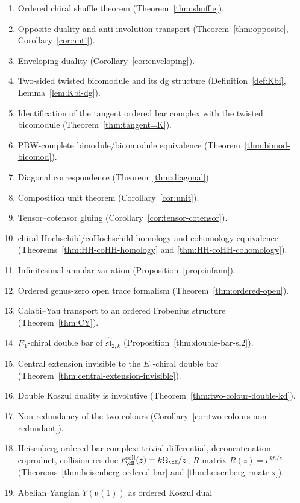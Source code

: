 \begin{enumerate}[label=(\arabic*)]
\item Ordered chiral shuffle theorem (Theorem~\ref{thm:shuffle}).
\item Opposite-duality and anti-involution transport (Theorem~\ref{thm:opposite},
Corollary~\ref{cor:anti}).
\item Enveloping duality (Corollary~\ref{cor:enveloping}).
\item Two-sided twisted bicomodule and its dg structure (Definition~\ref{def:Kbi},
Lemma~\ref{lem:Kbi-dg}).
\item Identification of the tangent ordered bar complex with the twisted bicomodule
(Theorem~\ref{thm:tangent=K}).
\item PBW-complete bimodule/bicomodule equivalence (Theorem~\ref{thm:bimod-bicomod}).
\item Diagonal correspondence (Theorem~\ref{thm:diagonal}).
\item Composition unit theorem (Corollary~\ref{cor:unit}).
\item Tensor--cotensor gluing (Corollary~\ref{cor:tensor-cotensor}).
\item chiral Hochschild/coHochschild homology and cohomology equivalence
(Theorems~\ref{thm:HH-coHH-homology} and \ref{thm:HH-coHH-cohomology}).
\item Infinitesimal annular variation (Proposition~\ref{prop:infann}).
\item Ordered genus-zero open trace formalism (Theorem~\ref{thm:ordered-open}).
\item Calabi--Yau transport to an ordered Frobenius structure (Theorem~\ref{thm:CY}).
\item $E_1$-chiral double bar of $\hat{\mathfrak{sl}}_{2,k}$
(Proposition~\ref{thm:double-bar-sl2}).
\item Central extension invisible to the $E_1$-chiral double bar
(Theorem~\ref{thm:central-extension-invisible}).
\item Double Koszul duality is involutive
(Theorem~\ref{thm:two-colour-double-kd}).
\item Non-redundancy of the two colours
(Corollary~\ref{cor:two-colours-non-redundant}).
\item Heisenberg ordered bar complex: trivial differential, deconcatenation
coproduct, collision residue $r^{\mathrm{coll}}_{\cH}(z) = k\Omega_{\cH}/z$,
$R$-matrix $R(z) = e^{k\hbar/z}$
(Theorems~\ref{thm:heisenberg-ordered-bar}
and \ref{thm:heisenberg-rmatrix}).
\item Abelian Yangian $Y(\mathfrak{u}(1))$ as ordered Koszul dual

\end{enumerate}

